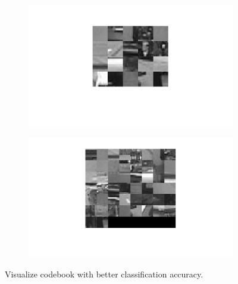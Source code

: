 \documentclass{ethz_report}
\begin{document}
\begin{figure}[h]
    \centering
    \begin{subfigure}[b]{.5\textwidth}
        \centering
        \includegraphics[width=1\linewidth]{images/visualize_codebook_20}
    \end{subfigure}%
    \begin{subfigure}[b]{.5\textwidth}
        \centering
        \includegraphics[width=1\linewidth]{images/visualize_codebook_50}
    \end{subfigure}
    \caption{Visualize codebook with better classification accuracy.}
    \label{fig:visualize_codebook_best}
\end{figure}
\end{document}
